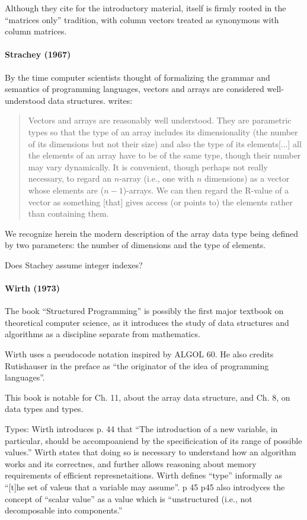 Although they cite \cite{Faddeev1959} for the introductory material, \cite{Faddeev1959} itself is firmly rooted in the ``matrices only'' tradition, with column vectors treated as synonymous with column matrices.



\paragraph{Strachey (1967)~\cite{Strachey1967}}

By the time computer scientists thought of formalizing the grammar and semantics of programming languages,
vectors and arrays are considered well-understood data structures. \cite[\S 3.7.7, pp. 43--44]{Strachey1967} writes:
\begin{quote}
Vectors and arrays are reasonably well understood. They are parametric types so that the type of an array includes its dimensionality (the number of
its dimensions but not their size) and also the type of its elements[...]
all the elements of an array have to be of the same type, though their number may vary dynamically.
It is convenient, though perhaps not really necessary, to regard an $n$-array
(i.e., one with $n$ dimensions) as a vector whose elements are ($n-1$)-arrays.
We can then regard the R-value of a vector as something [that] gives access (or points to) the elements rather than containing them.
\end{quote}
We recognize herein the modern description of the array data type being defined by
two parameters: the number of dimensions and the type of elements.

Does Stachey assume integer indexes?


\paragraph{Wirth (1973)~\cite{Wirth1973}}

The book ``Structured Programming'' is possibly the first major textbook on theoretical computer science, as it introduces the study of data structures and algorithms as a discipline separate from mathematics.

Wirth uses a pseudocode notation inspired by ALGOL 60. He also credits Rutishauser
in the preface as ``the originator of the idea of programming languages''.

This book is notable for Ch. 11, about the array data structure, and Ch. 8, on data types and types.

Types: Wirth introduces p. 44 that ``The introduction of a new variable, in particular,
should be accompoaniend by the specificication of
its range of possible values.'' Wirth states that doing so is necessary to understand
how an algorithm works and its correctnes, and further allows reasoning about memory requirements
of efficient represnetaitions.
Wirth defines ``type'' informally as ``[t]he set of valeus that a variable may assume''. p 45
p45 also introdyces the concept of ``scalar value'' as a value which is ``unstructured (i.e., not decomposable into components.''


